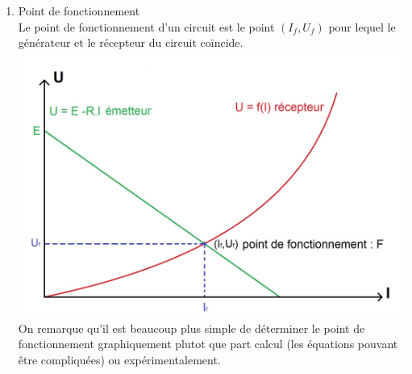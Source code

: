 \documentclass[12pt,a4paper]{article}
\begin{document}
\begin{enumerate}

\item Point de fonctionnement\\
Le point de fonctionnement d'un circuit est le point $(I_f,U_f)$ pour lequel le générateur et le récepteur du circuit coïncide. \\
\includegraphics[scale=0.2]{imtp1}\\ 
On remarque qu'il est beaucoup plus simple de déterminer le point de fonctionnement graphiquement plutot que part calcul (les équations pouvant être compliquées) ou expérimentalement.


\end{enumerate}
\end{document}
